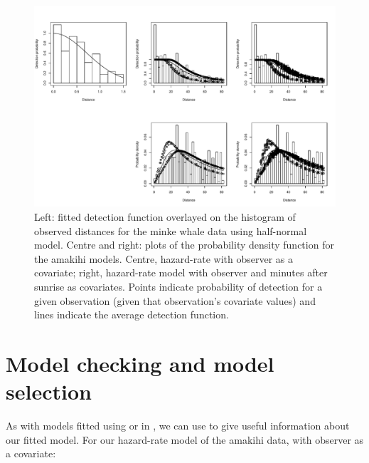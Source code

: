 \documentclass[article]{jss}
\begin{document}
\begin{CodeChunk}
\begin{figure}

{\centering \includegraphics{paper_files/figure-latex/minke-amakihi-hn-plot-1} 

}

\caption{Left: fitted detection function overlayed on the histogram of observed distances for the minke whale data using half-normal model. Centre and right: plots of the probability density function for the amakihi models. Centre, hazard-rate with observer as a covariate; right, hazard-rate model with observer and minutes after sunrise as covariates. Points indicate probability of detection for a given observation (given that observation's covariate values) and lines indicate the average detection function.\label{fig:minkeamakihi}}\label{fig:minke-amakihi-hn-plot}
\end{figure}
\end{CodeChunk}

\section{Model checking and model
selection}\label{model-checking-and-model-selection}

As with models fitted using  or  in , we
can use  to give useful information about our fitted
model. For our hazard-rate model of the amakihi data, with observer as a
covariate:
\end{document}
